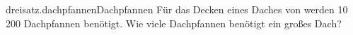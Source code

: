 \begin{exercise}{dreisatz.dachpfannen}{Dachpfannen}
  \ifproblem\problem
    Für das Decken eines Daches von  werden 10\,200 Dachpfannen benötigt.
    Wie viele Dachpfannen benötigt ein  großes Dach?
  \fi
\end{exercise}
